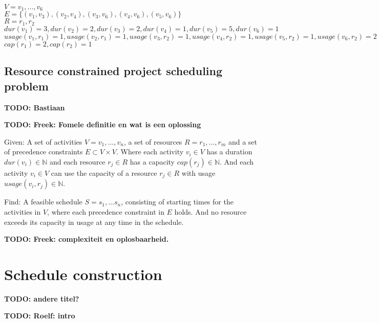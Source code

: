 \documentclass{article}
\newcommand{\TODO}[1]{{\color{red}\textbf{TODO: #1}}}
\newcommand{\capa}[1]{\ensuremath{cap(r_{#1})}} %
\newcommand{\dur}[1]{\ensuremath{dur(v_{#1})}} %
\newcommand{\usage}[2]{\ensuremath{usage(v_{#1}, r_{#2})}} %
\newenvironment{definition}[1][Definition]{\begin{trivlist}
\item[\hskip \labelsep {\bfseries #1}]}{\end{trivlist}}
\begin{document}
$V = v_1, \ldots, v_6$\\
$E = \{(v_1, v_3), (v_2, v_4), (v_3, v_6), (v_4, v_6), (v_5, v_6)\}$\\
$R = r_1, r_2$\\
$\dur{1} = 3, \dur{2} = 2, \dur{3} = 2, \dur{4} = 1, \dur{5} = 5, \dur{6} = 1$\\
$\usage{1}{1} = 1, \usage{2}{1} = 1, \usage{3}{2} = 1, \usage{4}{2} = 1, \usage{5}{2} = 1, \usage{6}{2} = 2$\\
$\capa{1} = 2, \capa{2} = 1$


\subsection{Resource constrained project scheduling problem}

\TODO{Bastiaan}


\TODO{Freek: Fomele definitie en wat is een oplossing}

\begin{definition}
Given:
A set of activities $V = v_1, \ldots, v_n$, a set of resources $R = r_1, \ldots, r_m$ and a set of precedence constraints $E \subset V \times V$.
Where each activity $v_i \in V$ has a duration $\dur{i} \in \mathbb{N}$ and each resource $r_j \in R$ has a capacity $\capa{j} \in \mathbb{N}$. 
And each activity $v_i \in V$ can use the capacity of a resource $r_j \in R$ with usage $\usage{i}{j} \in \mathbb{N}$.

Find:
A feasible schedule $S = s_1, \ldots s_n$, consisting of starting times for the activities in $V$, where each precedence constraint in $E$ holds.
And no resource exceeds its capacity in usage at any time in the schedule.
\end{definition}


\TODO{Freek: complexiteit en oplosbaarheid.}


\newpage


\section{Schedule construction} \TODO{andere titel?}

\TODO{Roelf: intro}
\end{document}
